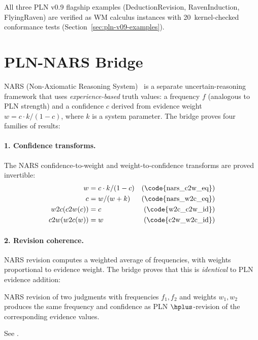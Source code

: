 \documentclass[11pt,openany]{report}
\begin{document}
\noindent
All three PLN v0.9 flagship examples (DeductionRevision,
RavenInduction, FlyingRaven) are verified as WM calculus instances
with 20~kernel-checked conformance tests
(Section~\ref{sec:pln-v09-examples}).

\section{PLN-NARS Bridge}
\label{sec:pln-nars-bridge}

NARS (Non-Axiomatic Reasoning System)~\cite{Wang2013NARS} is a
separate uncertain-reasoning framework that uses \emph{experience-based}
truth values: a frequency $f$ (analogous to PLN strength) and a
confidence $c$ derived from evidence weight $w = c \cdot k / (1 - c)$,
where $k$ is a system parameter.  The bridge proves four families of
results:

\paragraph{1. Confidence transforms.}
The NARS confidence-to-weight and weight-to-confidence transforms
are proved invertible:
\begin{align}
  w &= c \cdot k / (1 - c) & \text{(\code{nars\_c2w\_eq})} \\
  c &= w / (w + k) & \text{(\code{nars\_w2c\_eq})} \\
  w2c(c2w(c)) &= c & \text{(\code{w2c\_c2w\_id})} \\
  c2w(w2c(w)) &= w & \text{(\code{c2w\_w2c\_id})}
\end{align}

\paragraph{2. Revision coherence.}
NARS revision computes a weighted average of frequencies, with
weights proportional to evidence weight.  The bridge proves that
this is \emph{identical} to PLN evidence addition:

\begin{theorem}[NARS revision = PLN evidence algebra (\claimCore{})]
NARS revision of two judgments with frequencies $f_1, f_2$ and
weights $w_1, w_2$ produces the same frequency and confidence as
PLN $\hplus$-revision of the corresponding evidence values.
\end{theorem}

\noindent
See .
\end{document}
